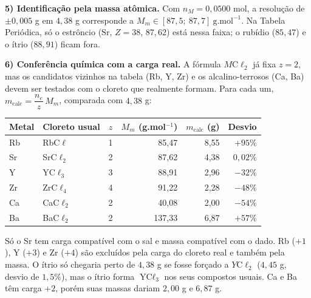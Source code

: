 \documentclass{article}%
\begin{document}
\textbf{5) Identificação pela massa atômica.} Com $n_M = 0{,}0500$ mol, a resolução de $\pm 0{,}005$ g em $4{,}38$ g corresponde a $M_m \in [87{,}5;\ 87{,}7]\ \text{g.mol}^{-1}$. Na Tabela Periódica, só o estrôncio ($\text{Sr}$, $Z = 38$, $87{,}62$) está nessa faixa; o rubídio ($85{,}47$) e o ítrio ($88{,}91$) ficam fora.

\textbf{6) Conferência química com a carga real.} A fórmula $M\text{C}\ell_2$ já fixa $z = 2$, mas os candidatos vizinhos na tabela (Rb, Y, Zr) e os alcalino-terrosos (Ca, Ba) devem ser testados com o cloreto que realmente formam. Para cada um, $m_{\text{calc}} = \dfrac{n_e}{z}\,M_m$, comparada com $4{,}38$ g:
\begin{center}
\begin{tabular}{llcrrr}
\hline
Metal & Cloreto usual & $z$ & $M_m$ (g.mol$^{-1}$) & $m_{\text{calc}}$ (g) & Desvio\\
\hline
Rb & RbC$\ell$ & 1 & 85,47 & 8,55 & $+95\%$\\
Sr & SrC$\ell_2$ & 2 & 87,62 & 4,38 & $0{,}02\%$\\
Y & YC$\ell_3$ & 3 & 88,91 & 2,96 & $-32\%$\\
Zr & ZrC$\ell_4$ & 4 & 91,22 & 2,28 & $-48\%$\\
Ca & CaC$\ell_2$ & 2 & 40,08 & 2,00 & $-54\%$\\
Ba & BaC$\ell_2$ & 2 & 137,33 & 6,87 & $+57\%$\\
\hline
\end{tabular}
\end{center}
Só o Sr tem carga compatível com o sal e massa compatível com o dado. Rb ($+1$), Y ($+3$) e Zr ($+4$) são excluídos pela carga do cloreto real e também pela massa. O ítrio só chegaria perto de $4{,}38$ g se fosse forçado a $Y\text{C}\ell_2$ ($4{,}45$ g, desvio de $1{,}5\%$), mas o ítrio forma $\text{YC}\ell_3$ nos seus compostos usuais. Ca e Ba têm carga $+2$, porém suas massas dariam $2{,}00$ g e $6{,}87$ g.
\end{document}
